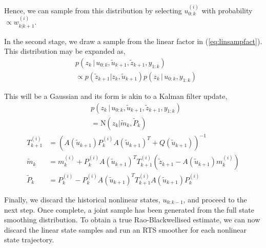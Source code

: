 \documentclass[twocolumn]{autart}    %
\begin{document}
Hence, we can sample from this distribution by selecting $u_{0:k}^{(i)}$ with probability $\propto w^{(i)}_{k|k+1}$.

In the second stage, we draw a sample from the linear factor in (\ref{eq:linsampfact}). This distribution may be expanded as,
%
\begin{equation}
\begin{split}
  &p(z_k\,|\, u_{0:k}, \tilde{u}_{k+1}, \tilde{z}_{k+1},y_{1:k}) \\
  &\propto p(\tilde{z}_{k+1} | z_k, \tilde{u}_{k+1}) p(z_k\,|\, u_{0:k}, y_{1:k})
\end{split}
\end{equation}

This will be a Gaussian and its form is akin to a Kalman filter update,
%
\begin{equation}
\begin{split}
  &p(z_k\,|\, u_{0:k}, \tilde{u}_{k+1}, \tilde{z}_{k+1},y_{1:k}) \\
  &= \mathrm{N}( z_k | \tilde{m}_k , \tilde{P}_k )
\end{split}
\end{equation}
%
\begin{equation}
\begin{split}
  T_{k+1}^{(i)} &= ( A(\tilde{u}_{k+1}) P_k^{(i)} A(\tilde{u}_{k+1})^T + Q(\tilde{u}_{k+1}) )^{-1} \\
  \tilde{m}_k &= m_k^{(i)} + P_k^{(i)} A(\tilde{u}_{k+1})^T T_{k+1}^{(i)} (\tilde{z}_{k+1} - A(\tilde{u}_{k+1}) m_k^{(i)} ) \\
  \tilde{P}_k &= P_k^{(i)} - P_k^{(i)} A(\tilde{u}_{k+1})^T T_{k+1}^{(i)} A(\tilde{u}_{k+1}) P_k^{(i)}
\end{split}
\label{eq:linsamplinupd}
\end{equation}

Finally, we discard the historical nonlinear states, $u_{0:k-1}$, and proceed to the next step. Once complete, a joint sample has been generated from the full state smoothing distribution. To obtain a true Rao-Blackwellised estimate, we can now discard the linear state samples and run an RTS smoother for each nonlinear state trajectory.
\end{document}
